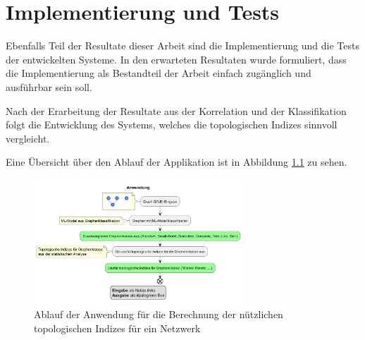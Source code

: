 \chapter{Implementierung und Tests}

Ebenfalls Teil der Resultate dieser Arbeit sind die Implementierung und die Tests der entwickelten Systeme.
In den erwarteten Resultaten wurde formuliert, dass die Implementierung als Bestandteil der Arbeit einfach zugänglich und ausführbar sein soll.

Nach der Erarbeitung der Resultate aus der Korrelation und der Klassifikation folgt die Entwicklung des Systems, welches die topologischen Indizes sinnvoll vergleicht.

Eine Übersicht über den Ablauf der Applikation ist in Abbildung \ref{fig:flowchart} zu sehen.

\begin{figure}[H]
    \centering
    \includegraphics[width=0.7\textwidth]{images/30_results/activity_app.png}
    \caption{Ablauf der Anwendung für die Berechnung der nützlichen topologischen Indizes für ein Netzwerk}
    \label{fig:flowchart}
\end{figure}

\newpage




